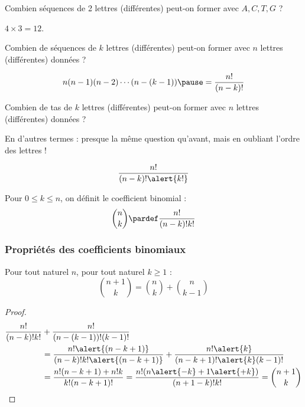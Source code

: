 \begin{frame}  %
  \begin{question}
    Combien séquences de 2 lettres (différentes) peut-on former avec \(A, C, T, G\) ?
  \end{question}
  \begin{answer}
    \(4 \times 3 = 12.\)
  \end{answer}
  \begin{question}
    Combien de séquences de \(k\) lettres (différentes) peut-on former avec \(n\) lettres (différentes) données ?
  \end{question}
  \begin{answer}
    \begin{equation*}
      n (n-1) (n-2) \cdots (n-(k-1)) \pause = \frac{n!}{(n-k)!}
    \end{equation*}
  \end{answer}
\end{frame}
\begin{frame}  %
  \begin{question}
    Combien de \og tas\fg{} de \(k\) lettres (différentes) peut-on former avec \(n\) lettres (différentes) données ?
  \end{question}
  En d'autres termes : presque la même question qu'avant, mais en oubliant l'ordre des lettres !
  \begin{answer}\pause
    \begin{equation*}
      \frac{n!}{(n-k)!\alert{k!}}
    \end{equation*}
  \end{answer}
  \begin{definition}
    Pour \(0 \leq k \leq n\), on définit le coefficient binomial :
    \begin{equation*}
      \binom{n}{k} \pardef \frac{n!}{(n-k)!k!}
    \end{equation*}
  \end{definition}
\end{frame}
\begin{frame}%
  \frametitle{Propriétés des coefficients binomiaux}
  \begin{proposition}Pour tout naturel \(n\), pour tout naturel \(k \geq 1\) :
  \begin{equation*}
    \binom{n+1}{k} = \binom{n}{k} + \binom{n}{k-1}
  \end{equation*}
\end{proposition}
\begin{proof}
  \begin{align*}
    \frac{n!}{(n-k)!k!}& + \frac{n!}{(n-(k-1))!(k-1)!}\\
    &= \frac{n!\alert{(n-k+1)}}{(n-k)!k!\alert{(n-k+1)}} + \frac{n! \alert{k}}{(n-k+1)!\alert{k} (k-1)!}\\
    &= \frac{n!(n-k+1) + n! k}{k!(n-k+1)!} = \frac{n!(n\alert{-k}+1 \alert{+ k})}{(n+1-k)!k!} = \binom{n+1}{k}
  \end{align*}
\end{proof}
\end{frame}
